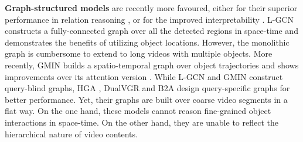 \documentclass[letterpaper]{article} \usepackage{aaai21}  \usepackage{times}  \usepackage{helvet} \usepackage{courier}  \usepackage[hyphens]{url}  \usepackage{graphicx} \urlstyle{rm} \def\UrlFont{\rm}  \usepackage{natbib}  \usepackage{caption} \usepackage{color, colortbl}
\begin{document}
\textbf{Graph-structured models} \cite{kipf2016semi,velivckovic2018graph} are recently more favoured, 
either for their superior performance in relation reasoning \cite{li2019relation,hu2019language}, or for the improved interpretability \cite{norcliffe2018learning}. L-GCN \cite{huang2020location} constructs a fully-connected graph over all the detected regions in space-time and demonstrates the benefits of utilizing object locations. However, the monolithic graph is cumbersome to extend to long videos with multiple objects. More recently, GMIN \cite{gu2021graph} builds a spatio-temporal graph over object trajectories and shows improvements over its attention version \cite{jin2019multi}. While L-GCN and GMIN construct query-blind graphs, HGA \cite{jiang2020reasoning}, DualVGR \cite{wang2021dualvgr} and B2A \cite{park2021bridge} design query-specific graphs for better performance. Yet, their graphs are built over coarse video segments in a flat way. On the one hand, these models cannot reason fine-grained object interactions in space-time. On the other hand, they are unable to reflect the hierarchical nature of video contents.
\end{document}

